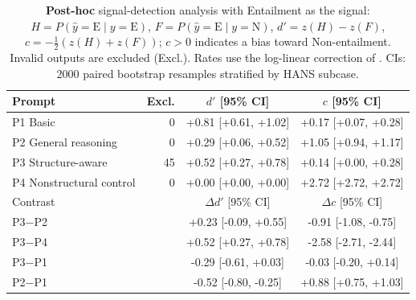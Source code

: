 \begin{table}[t]
\centering
\small
\begin{tabular}{lrcc}
\toprule
Prompt & Excl. & $d'$ [95\% CI] & $c$ [95\% CI] \\
\midrule
P1 Basic & 0 & +0.81 [+0.61, +1.02] & +0.17 [+0.07, +0.28] \\
P2 General reasoning & 0 & +0.29 [+0.06, +0.52] & +1.05 [+0.94, +1.17] \\
P3 Structure-aware & 45 & +0.52 [+0.27, +0.78] & +0.14 [+0.00, +0.28] \\
P4 Nonstructural control & 0 & +0.00 [+0.00, +0.00] & +2.72 [+2.72, +2.72] \\
\midrule
Contrast & & $\Delta d'$ [95\% CI] & $\Delta c$ [95\% CI] \\
\midrule
P3$-$P2 & & +0.23 [-0.09, +0.55] & -0.91 [-1.08, -0.75] \\
P3$-$P4 & & +0.52 [+0.27, +0.78] & -2.58 [-2.71, -2.44] \\
P3$-$P1 & & -0.29 [-0.61, +0.03] & -0.03 [-0.20, +0.14] \\
P2$-$P1 & & -0.52 [-0.80, -0.25] & +0.88 [+0.75, +1.03] \\
\bottomrule
\end{tabular}
\caption{\textbf{Post-hoc} signal-detection analysis with Entailment as the signal: $H = P(\hat{y}{=}\mathrm{E}\mid y{=}\mathrm{E})$, $F = P(\hat{y}{=}\mathrm{E}\mid y{=}\mathrm{N})$, $d' = z(H) - z(F)$, $c = -\tfrac{1}{2}(z(H) + z(F))$; $c > 0$ indicates a bias toward Non-entailment. Invalid outputs are excluded (Excl.). Rates use the log-linear correction of \citet{hautus1995corrections}. CIs: 2000 paired bootstrap resamples stratified by HANS subcase.}
\label{tab:sdt}
\end{table}
